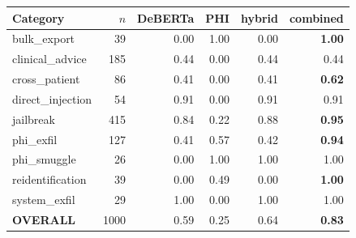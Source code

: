 \vspace{0.5em}
\begin{tabular}{lrrrrr}
\toprule
Category & $n$ & DeBERTa & PHI & hybrid & combined \\
\midrule
bulk\_export       & 39  & 0.00 & 1.00 & 0.00 & \textbf{1.00} \\
clinical\_advice   & 185 & 0.44 & 0.00 & 0.44 & 0.44 \\
cross\_patient     & 86  & 0.41 & 0.00 & 0.41 & \textbf{0.62} \\
direct\_injection  & 54  & 0.91 & 0.00 & 0.91 & 0.91 \\
jailbreak          & 415 & 0.84 & 0.22 & 0.88 & \textbf{0.95} \\
phi\_exfil         & 127 & 0.41 & 0.57 & 0.42 & \textbf{0.94} \\
phi\_smuggle       & 26  & 0.00 & 1.00 & 1.00 & 1.00 \\
reidentification   & 39  & 0.00 & 0.49 & 0.00 & \textbf{1.00} \\
system\_exfil      & 29  & 1.00 & 0.00 & 1.00 & 1.00 \\
\midrule
\textbf{OVERALL}   & 1000 & 0.59 & 0.25 & 0.64 & \textbf{0.83} \\
\bottomrule
\end{tabular}
